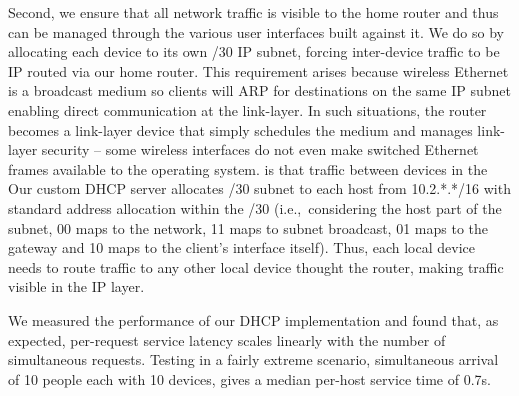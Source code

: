 Second, we ensure that all network traffic is visible to the home router and
thus can be managed through the various user interfaces built against it.  We do
so by allocating each device to its own /30 IP subnet, forcing inter-device
traffic to be IP routed via our home router.  This requirement arises because
wireless Ethernet is a broadcast medium so clients will ARP for destinations on
the same IP subnet enabling direct communication at the link-layer.  In such
situations, the router becomes a link-layer device that simply schedules the
medium and manages link-layer security -- some wireless interfaces do not even
make switched Ethernet frames available to the operating system. %
is that traffic between devices in the
Our custom DHCP server allocates /30 subnet to each host from 10.2.*.*/16 with
standard address allocation within the /30 (i.e.,~considering the host part of
the subnet, 00 maps to the network, 11 maps to subnet broadcast, 01 maps to the
gateway and 10 maps to the client's interface itself). Thus, each local device
needs to route traffic to any other local device thought the router, making
traffic visible in the IP layer.
%

We measured the performance of our DHCP implementation and found that, as
expected, per-request service latency scales linearly with the number of
simultaneous requests.  Testing in a fairly extreme scenario, simultaneous
arrival of 10 people each with 10 devices,  gives a median per-host service time
of 0.7s.

